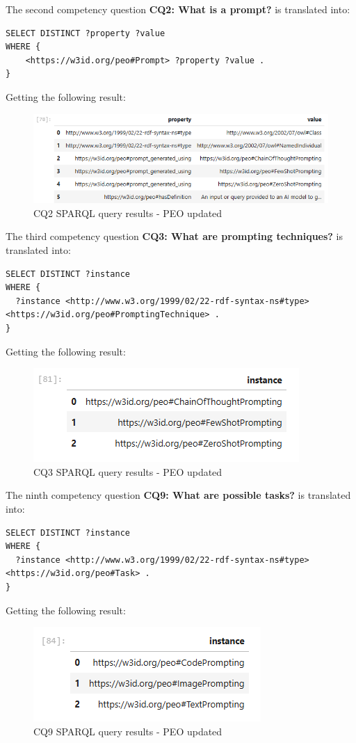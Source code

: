 The second competency question \textbf{CQ2: What is a prompt?} is translated
into:
\begin{lstlisting}
SELECT DISTINCT ?property ?value
WHERE {
    <https://w3id.org/peo#Prompt> ?property ?value .
}
\end{lstlisting}
Getting the following result:
\begin{figure}[H]
    \centering
    \includegraphics[width=0.9\linewidth]{Figures/fig_70.png}
    \caption{CQ2 SPARQL query results - PEO updated}
    \label{fig:enter-label}
\end{figure}

The third competency question \textbf{CQ3: What are prompting techniques?}
is translated into:
\begin{lstlisting}
SELECT DISTINCT ?instance
WHERE {
  ?instance <http://www.w3.org/1999/02/22-rdf-syntax-ns#type> <https://w3id.org/peo#PromptingTechnique> .
}
\end{lstlisting}
Getting the following result:
\begin{figure}[H]
    \centering
    \includegraphics[width=0.7\linewidth]{Figures/fig_71.png}
    \caption{CQ3 SPARQL query results - PEO updated}
    \label{fig:enter-label}
\end{figure}

The ninth competency question \textbf{CQ9: What are possible tasks?} is translated
into:
\begin{lstlisting}
SELECT DISTINCT ?instance
WHERE {
  ?instance <http://www.w3.org/1999/02/22-rdf-syntax-ns#type> <https://w3id.org/peo#Task> .
}
\end{lstlisting}
Getting the following result:
\begin{figure}[H]
    \centering
    \includegraphics[width=0.6\linewidth]{Figures/fig_72.png}
    \caption{CQ9 SPARQL query results - PEO updated}
    \label{fig:enter-label}
\end{figure}

